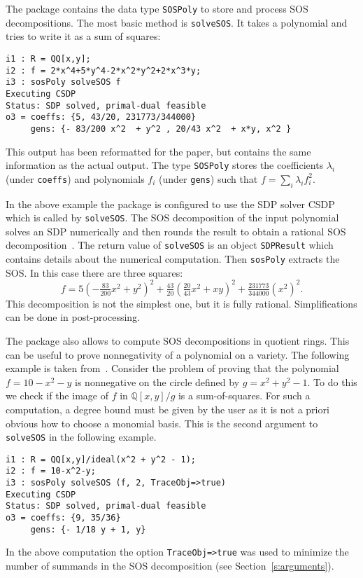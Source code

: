 \documentclass[11pt]{amsart}
\theoremstyle{plain}%
\theoremstyle{definition}
\theoremstyle{remark}
\newcommand{\QQ}{\mathbb{Q}}
\begin{document}
The package contains the data type \verb|SOSPoly| to store and process SOS decompositions.
The most basic method is \verb|solveSOS|.
It takes a polynomial and tries to write it as a sum of squares:
{\small
\begin{verbatim}
i1 : R = QQ[x,y];
i2 : f = 2*x^4+5*y^4-2*x^2*y^2+2*x^3*y;
i3 : sosPoly solveSOS f
Executing CSDP
Status: SDP solved, primal-dual feasible
o3 = coeffs: {5, 43/20, 231773/344000}              
     gens: {- 83/200 x^2  + y^2 , 20/43 x^2  + x*y, x^2 }
\end{verbatim}
}
\noindent
This output has been reformatted for the paper, but contains the same information as the actual output.
The type \verb|SOSPoly| stores the coefficients $\lambda_{i}$ (under \verb|coeffs|) and polynomials $f_{i}$ (under \verb|gens|) such that $f = \sum_{i}\lambda_{i}f_{i}^{2}$.

In the above example the package is configured to use the SDP solver CSDP which is called by \verb|solveSOS|.
The SOS decomposition of the input polynomial solves an SDP numerically and then rounds the result to obtain a rational SOS decomposition~\cite{peyrl2008computing}.
The return value of \verb|solveSOS| is an object \verb|SDPResult| which contains details about the numerical computation.
Then \verb|sosPoly| extracts the SOS.
In this case there are three squares:
\[
  f = 5(-\tfrac{83}{200} x^{2}+y^{2})^{2} + \tfrac{43}{20}
  (\tfrac{20}{43}x^{2} + xy)^{2} + \tfrac{231773}{344000} (x^{2})^{2}.
\]
This decomposition is not the simplest one, but it is fully rational. 
Simplifications can be done in post-processing.

The package also allows to compute SOS decompositions in quotient rings.
This can be useful to prove nonnegativity of a polynomial on a variety.  
The following example is taken from~\cite{parrilo2005exploiting}.  
Consider the problem of proving that the polynomial $f = 10{-}x^2{-}y$ is nonnegative on the circle defined by $g = x^2 {+} y^2 {-} 1$.
To do this we check if the image of $f$ in $\QQ[x,y]/g$ is a sum-of-squares.
For such a computation, a degree bound must be given by the user as it is not a priori obvious how to choose a monomial basis.
This is the second argument to \verb|solveSOS| in the following example.
{\small
\begin{verbatim}
i1 : R = QQ[x,y]/ideal(x^2 + y^2 - 1);
i2 : f = 10-x^2-y;
i3 : sosPoly solveSOS (f, 2, TraceObj=>true)
Executing CSDP
Status: SDP solved, primal-dual feasible
o3 = coeffs: {9, 35/36}      
     gens: {- 1/18 y + 1, y} 
\end{verbatim}
}
\noindent
In the above computation the option \verb|TraceObj=>true| was used to minimize the number of summands in the SOS decomposition (see Section~\ref{s:arguments}).
\end{document}
